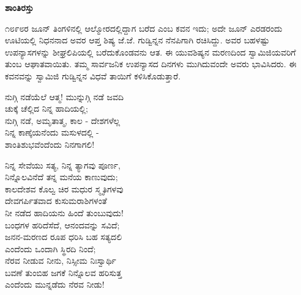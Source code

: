 \begin{myquote}
\end{myquote}

\selectkan

\begin{center}
\textbf{ಶಾಂತಿರಸ್ತು}
\end{center}

೧೮೯೮ರ ಜೂನ್ ತಿಂಗಳಿನಲ್ಲಿ ಆಲ್ಮೋರದಲ್ಲಿದ್ದಾಗ ಬರೆದ  ಎಂಬ ಕವನ ಇದು; ಅದೇ ಜೂನ್ ಎರಡರಂದು ಊಟಿಯಲ್ಲಿ ನಿಧನನಾದ ಅವರ ಆಪ್ತ ಶಿಷ್ಯ ಜೆ.ಜೆ. ಗುಡ್ವಿನ್ನನ ನೆನಪಿಗಾಗಿ ರಚಿಸಿದ್ದು. ಅವರ ಬಹಳಷ್ಟು ಉಪನ್ಯಾಸಗಳನ್ನು ಶೀಘ್ರಲಿಪಿಯಲ್ಲಿ ಬರೆದುಕೊಂಡವನು ಆತ. ಈ ಯುವಶಿಷ್ಯನ ಮರಣದಿಂದ ಸ್ವಾಮಿಜಿಯವರಿಗೆ ತುಂಬ ಆಘಾತವಾಯಿತು. ತಮ್ಮ ಸಾರ್ವಜನಿಕ ಉಪನ್ಯಾಸದ ದಿನಗಳು ಮುಗಿದುವಂದೇ ಅವರು ಭಾವಿಸಿದರು. ಈ ಕವನವನ್ನು ಸ್ವಾಮಿಜಿ ಗುಡ್ವಿನ್ನನ ವಿಧವೆ ತಾಯಿಗೆ ಕಳಿಸಿಕೊಡುತ್ತಾರೆ.

\begin{myquote}
ನುಗ್ಗಿ ನಡೆಯೆಲೆ ಆತ್ಮ! ಮುನ್ನುಗ್ಗಿ ನಡೆ ಜವದಿ\\ಚುಕ್ಕೆ ಚೆಲ್ಲಿದ ನಿನ್ನ ಹಾದಿಯಲ್ಲಿ;\\ನುಗ್ಗಿ ನಡೆ, ಅಮೃತಾತ್ಮ, ಕಾಲ - ದೇಶಗಳೆಲ್ಲ\\ನಿನ್ನ ಕಾಣ್ಕೆಯನೆಂದು ಮಸುಳದಲ್ಲಿ -\\ಶಾಂತಿಶುಭವೆಂದೆಂದು ನಿನಗಾಗಲಿ!
\end{myquote}

\begin{myquote}
ನಿನ್ನ ಸೇವೆಯು ಸತ್ಯ, ನಿನ್ನ ತ್ಯಾಗವು ಪೂರ್ಣ,\\ನಿನ್ನೊಲವಿನೆದೆ ತನ್ನ ಮನೆಯ ಕಾಣುವುದು;\\ಕಾಲದೇಶವ ಕೊಲ್ವ ಚಿರ ಮಧುರ ಸ್ಮೃತಿಗಳವು\\ದೇವಗರ್ಪಿತವಾದ ಕುಸುಮರಾಶಿಗಳಂತೆ\\ನೀ ನಡೆದ ಹಾದಿಯನು ಹಿಂದೆ ತುಂಬುವುದು!\\ಬಂಧಗಳ ಹರಿದೆಸೆದೆ, ಆನಂದವನ್ನು ಸವಿದೆ;\\ಜನನ-ಮರಣದ ರೂಪ ಧರಿಸಿ ಬಹ ಸತ್ಯದಲಿ\\ಎಂದೆಂದು ಒಂದಾಗಿ ಸ್ಥಿರದಿ ನಿಂದೆ;\\ನೆರವ ನೀಡುವ ನೀನು, ನಿಸ್ಸೀಮ ನಿಃಸ್ವಾರ್ಥಿ\\ಬವಣೆ ತುಂಬಿಹ ಜಗಕೆ ನಿನ್ನೊಲವ ಹರಿಸುತ್ತ\\ಎಂದೆಂದು ಮುನ್ನಡೆದು ನೆರವ ನೀಡು!
\end{myquote}

\selecteng


